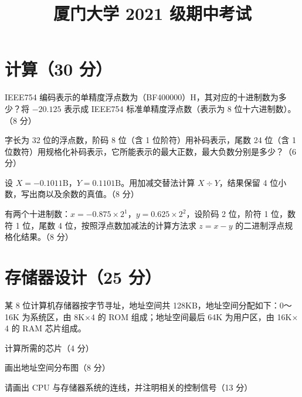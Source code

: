 \documentclass[fontset=exam]{exam-zh}
\title{厦门大学 2021 级期中考试}
\begin{document}
\maketitle
\noindent{}\par
{}
\section{计算（30 分）}
\begin{question}[index=1]
IEEE754 编码表示的单精度浮点数为（BF400000）H，其对应的十进制数为多少？将 \(-20.125\) 表示成 IEEE754 标准单精度浮点数（表示为 8 位十六进制数）。（8 分）
\end{question}
\begin{question}[index=2]
字长为 32 位的浮点数，阶码 8 位（含 1 位阶符）用补码表示，尾数 24 位（含 1 位数符）用规格化补码表示，它所能表示的最大正数，最大负数分别是多少？（6 分）
\end{question}
\begin{question}[index=3]
设 \(X=-0.1011\mathrm{B}\)，\(Y=0.1101\mathrm{B}\)。用加减交替法计算 \(X\div Y\)，结果保留 4 位小数，写出商以及余数的真值。（8 分）
\end{question}
\begin{question}[index=4]
有两个十进制数：\(x=-0.875\times2^1\)，\(y=0.625\times2^2\)，设阶码 2 位，阶符 1 位，数符 1 位，尾数 4 位，按照浮点数加减法的计算方法求 \(z=x-y\) 的二进制浮点规格化结果。（8 分）
\end{question}
\section{存储器设计（25 分）}
某 8 位计算机存储器按字节寻址，地址空间共 128KB，地址空间分配如下：0～16K 为系统区，由 8K\(\times\)4 的 ROM 组成；地址空间最后 64K 为用户区，由 16K\(\times\)4 的 RAM 芯片组成。\par
\begin{question}[index=1]
计算所需的芯片（4 分）
\end{question}
\begin{question}[index=2]
画出地址空间分布图（8 分）
\end{question}
\begin{question}[index=3]
请画出 CPU 与存储器系统的连线，并注明相关的控制信号（13 分）
\end{question}
\newpage
{}
\end{document}
